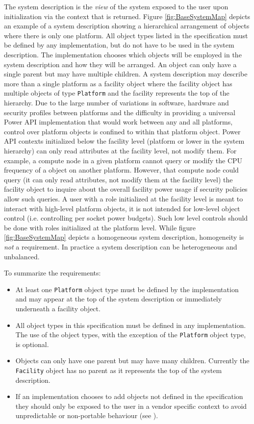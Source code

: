 The system description is the \textit{view} of the system exposed to the user upon initialization via the context that is returned.
Figure \ref{fig:BaseSystemMap} depicts an example of a system description showing a hierarchical arrangement of objects where there is only one platform.
All object types listed in the specification must be defined by any implementation, but do not have to be used in the system description.
The implementation chooses which objects will be employed in the system description and how they will be arranged.
An object can only have a single parent but may have multiple children.
A system description may describe more than a single platform as a facility object where the facility object has multiple objects of type \texttt{Platform} and the facility represents the top of the hierarchy. 
Due to the large number of variations in software, hardware and security profiles between platforms and the difficulty in providing a universal Power API implementation that would work between any and all platforms, control over platform objects is confined to within that platform object. 
Power API contexts initialized below the facility level (platform or lower in the system hierarchy) can only read attributes at the facility level, not modify them.
For example, a compute node in a given platform cannot query or modify the CPU frequency of a object on another platform. 
However, that compute node could query (it can only read attributes, not modify them at the facility level) the facility object to inquire about the overall facility power usage if security policies allow such queries. 
A user with a role initialized at the facility level is meant to interact with high-level platform objects, it is not intended for low-level object control (i.e. controlling per socket power budgets). Such low level controls should be done with roles initialized at the platform level.
While figure \ref{fig:BaseSystemMap} depicts a homogeneous system description, homogeneity is \textit{not} a requirement. 
In practice a system description can be heterogeneous and unbalanced.

To summarize the requirements:
\begin{itemize}[noitemsep,nolistsep] %
	\item{
	At least one \texttt{Platform} object type must be defined by the implementation and may appear at the top of the system description or immediately underneath a facility object.
	}
	\item{
	All object types in this specification must be defined in any implementation. The use of the object types, with the exception of the \texttt{Platform} object type, is optional.
	}
	\item{
	Objects can only have one parent but may have many children. Currently the \texttt{Facility} object has no parent as it represents the top of the system description.
	}
        \item{
        If an implementation chooses to add objects not defined in the specification they should only be exposed to the user in a vendor specific context to avoid unpredictable or non-portable behaviour (see ).
        }
\end{itemize}

